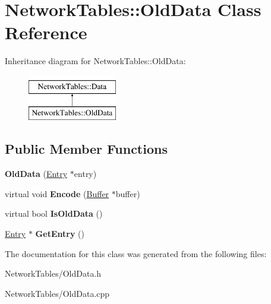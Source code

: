 \hypertarget{classNetworkTables_1_1OldData}{
\section{NetworkTables::OldData Class Reference}
\label{classNetworkTables_1_1OldData}
}
Inheritance diagram for NetworkTables::OldData:\begin{figure}[H]
\begin{center}
\leavevmode
\includegraphics[height=2.000000cm]{classNetworkTables_1_1OldData}
\end{center}
\end{figure}
\subsection*{Public Member Functions}
\begin{DoxyCompactItemize}
\item 
\hypertarget{classNetworkTables_1_1OldData_af43b11c7ab077d336ce353f361256b8a}{
{\bfseries OldData} (\hyperlink{classNetworkTables_1_1Entry}{Entry} $\ast$entry)}
\label{classNetworkTables_1_1OldData_af43b11c7ab077d336ce353f361256b8a}

\item 
\hypertarget{classNetworkTables_1_1OldData_ad379ebd40a5eebe01b254176623f1fc2}{
virtual void {\bfseries Encode} (\hyperlink{classNetworkTables_1_1Buffer}{Buffer} $\ast$buffer)}
\label{classNetworkTables_1_1OldData_ad379ebd40a5eebe01b254176623f1fc2}

\item 
\hypertarget{classNetworkTables_1_1OldData_a2f9b32cfbd371cdddce0d749465ef346}{
virtual bool {\bfseries IsOldData} ()}
\label{classNetworkTables_1_1OldData_a2f9b32cfbd371cdddce0d749465ef346}

\item 
\hypertarget{classNetworkTables_1_1OldData_ae5d5ca44ef40195c5835d5cf222787fa}{
\hyperlink{classNetworkTables_1_1Entry}{Entry} $\ast$ {\bfseries GetEntry} ()}
\label{classNetworkTables_1_1OldData_ae5d5ca44ef40195c5835d5cf222787fa}

\end{DoxyCompactItemize}


The documentation for this class was generated from the following files:\begin{DoxyCompactItemize}
\item 
NetworkTables/OldData.h\item 
NetworkTables/OldData.cpp\end{DoxyCompactItemize}
